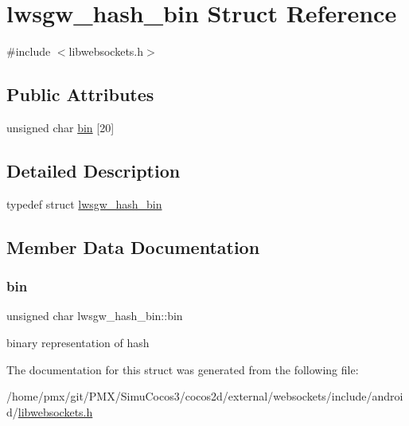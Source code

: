 \hypertarget{structlwsgw__hash__bin}{}\section{lwsgw\+\_\+hash\+\_\+bin Struct Reference}
\label{structlwsgw__hash__bin}


{\ttfamily \#include $<$libwebsockets.\+h$>$}

\subsection*{Public Attributes}
\begin{DoxyCompactItemize}
\item 
unsigned char \hyperlink{structlwsgw__hash__bin_a1bf8ceaaef37d73daabf6baf89119bc7}{bin} \mbox{[}20\mbox{]}
\end{DoxyCompactItemize}


\subsection{Detailed Description}
typedef struct \hyperlink{structlwsgw__hash__bin}{lwsgw\+\_\+hash\+\_\+bin} 

\subsection{Member Data Documentation}
\mbox{\label{structlwsgw__hash__bin_a1bf8ceaaef37d73daabf6baf89119bc7}} 
\subsubsection{\texorpdfstring{bin}{bin}}
{\footnotesize\ttfamily unsigned char lwsgw\+\_\+hash\+\_\+bin\+::bin}

binary representation of hash 

The documentation for this struct was generated from the following file\+:\begin{DoxyCompactItemize}
\item 
/home/pmx/git/\+P\+M\+X/\+Simu\+Cocos3/cocos2d/external/websockets/include/android/\hyperlink{_2cocos2d_2external_2websockets_2include_2android_2libwebsockets_8h}{libwebsockets.\+h}\end{DoxyCompactItemize}
